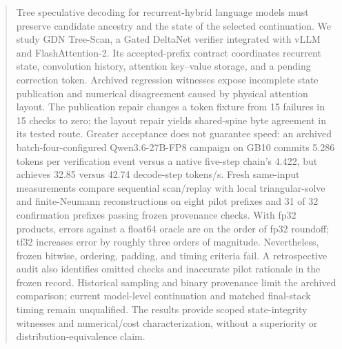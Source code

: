\begin{abstract}
Tree speculative decoding for recurrent-hybrid language models must preserve candidate ancestry and the state of the selected continuation. We study GDN Tree-Scan, a Gated DeltaNet verifier integrated with vLLM and FlashAttention-2. Its accepted-prefix contract coordinates recurrent state, convolution history, attention key--value storage, and a pending correction token. Archived regression witnesses expose incomplete state publication and numerical disagreement caused by physical attention layout. The publication repair changes a token fixture from 15 failures in 15 checks to zero; the layout repair yields shared-spine byte agreement in its tested route. Greater acceptance does not guarantee speed: an archived batch-four-configured Qwen3.6-27B-FP8 campaign on GB10 commits 5.286 tokens per verification event versus a native five-step chain's 4.422, but achieves 32.85 versus 42.74 decode-step tokens/s. Fresh same-input measurements compare sequential scan/replay with local triangular-solve and finite-Neumann reconstructions on eight pilot prefixes and 31 of 32 confirmation prefixes passing frozen provenance checks. With fp32 products, errors against a float64 oracle are on the order of fp32 roundoff; tf32 increases error by roughly three orders of magnitude. Nevertheless, frozen bitwise, ordering, padding, and timing criteria fail. A retrospective audit also identifies omitted checks and inaccurate pilot rationale in the frozen record. Historical sampling and binary provenance limit the archived comparison; current model-level continuation and matched final-stack timing remain unqualified. The results provide scoped state-integrity witnesses and numerical/cost characterization, without a superiority or distribution-equivalence claim.
\end{abstract}
